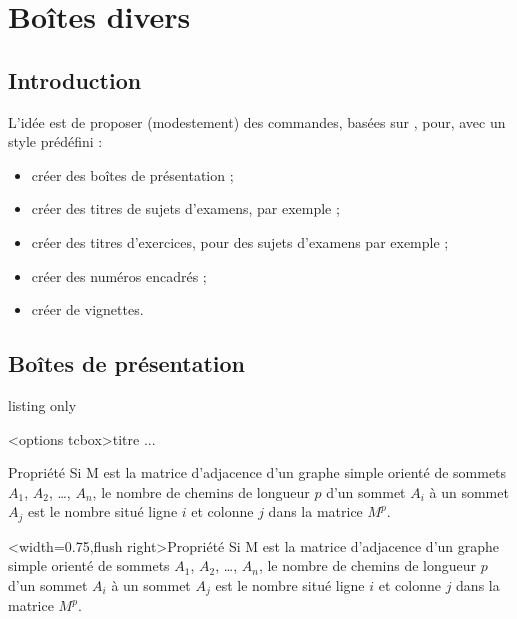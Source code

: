 \documentclass[french,11pt,a4paper]{article}
\begin{document}
\pagebreak

\section{Boîtes divers}

\subsection{Introduction}

L'idée est de proposer (modestement) des commandes, basées sur , pour, avec un style prédéfini :

\begin{itemize}
	\item créer des boîtes de présentation ;
	\item créer des titres de sujets d'examens, par exemple ;
	\item créer des titres d'exercices, pour des sujets d'examens par exemple ;
	\item créer des numéros encadrés ;
	\item créer de vignettes.
\end{itemize}

\subsection{Boîtes de présentation}

\begin{DemoCode}{listing only}
\begin{BoiteSimple}[couleur]<options tcbox>{titre}
	...
\end{BoiteSimple}
\end{DemoCode}

\begin{DemoCode}{}
\begin{BoiteSimple}[red]{Propriété}
Si M est la matrice d'adjacence d'un graphe simple orienté de sommets $A_1$, $A_2$, \dots, $A_n$, le nombre de chemins de longueur $p$ d'un sommet $A_i$  à un sommet $A_j$ est le nombre situé ligne $i$ et colonne $j$ dans la matrice $M^p$.
\end{BoiteSimple}
\end{DemoCode}

\begin{DemoCode}{}
\begin{BoiteSimple}[blue]<width=0.75\linewidth,flush right>{Propriété}
Si M est la matrice d'adjacence d'un graphe simple orienté de sommets $A_1$, $A_2$, \dots, $A_n$, le nombre de chemins de longueur $p$ d'un sommet $A_i$  à un sommet $A_j$ est le nombre situé ligne $i$ et colonne $j$ dans la matrice $M^p$.
\end{BoiteSimple}
\end{DemoCode}
\end{document}
